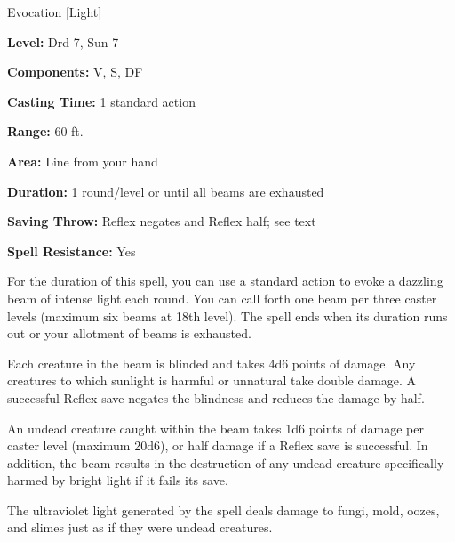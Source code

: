
Evocation [Light]

\textbf{Level:} Drd 7, Sun 7

\textbf{Components:} V, S, DF

\textbf{Casting Time:} 1 standard action

\textbf{Range:} 60 ft.

\textbf{Area:} Line from your hand

\textbf{Duration:} 1 round/level or until all beams are exhausted

\textbf{Saving Throw:} Reflex negates and Reflex half; see text

\textbf{Spell Resistance:} Yes

For the duration of this spell, you can use a standard action to evoke a dazzling 
beam of intense light each round. You can call forth one beam per three caster 
levels (maximum six beams at 18th level). The spell ends when its duration runs 
out or your allotment of beams is exhausted.

Each creature in the beam is blinded and takes 4d6 points of damage. Any creatures 
to which sunlight is harmful or unnatural take double damage. A successful Reflex 
save negates the blindness and reduces the damage by half.

An undead creature caught within the beam takes 1d6 points of damage per caster 
level (maximum 20d6), or half damage if a Reflex save is successful. In addition, 
the beam results in the destruction of any undead creature specifically harmed 
by bright light if it fails its save.

The ultraviolet light generated by the spell deals damage to fungi, mold, oozes, 
and slimes just as if they were undead creatures.

